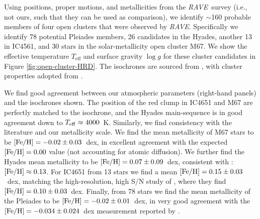 \documentclass[preprint]{aastex61}
\newcommand{\acronym}[1]{{\small{#1}}}
\newcommand{\project}[1]{\textsl{#1}}
\newcommand{\rave}{\project{\acronym{RAVE}}}
\newcommand{\teff}{T_{\mathrm{eff}}}
\newcommand{\logg}{\log g}
\begin{document}
Using positions, proper motions, and metallicities from the \rave\ survey
(i.e., not ours, such that they can be used as comparison), we identify $\sim$160 
probable members of four open clusters that were observed by \rave.
Specifically we identify 78 potential Pleiades members, 26 candidates in the
Hyades, another 13 in IC4561, and 30 stars in the solar-metallicity open
cluster M67.
We show the effective temperature $\teff$ and surface gravity $\logg$ for these
cluster candidates in Figure \ref{fig:open-cluster-HRD}.  The isochrones are 
sourced from \citet{Bressan_2012}, with cluster properties adopted from 
\cite{Kharchenko_2013}.  




We find good agreement between our atmospheric parameters (right-hand panels) and the 
isochrones shown.  The position of the red clump in IC4651 and M67 are perfectly matched
to the isochrone, and the Hyades main-sequence is in good agreement down to 
$T_{\rm eff} \approx 4000$~K.  Similarly, we find consistency with the literature and
our metallicity scale.  We find the mean metallicity of M67 stars to be 
$[{\rm Fe/H}] = -0.02 \pm 0.03$~dex, in excellent agreement with the expected 
$[{\rm Fe/H}] = 0.00$ value (not accounting for atomic diffusion).
We further find the Hyades mean metallicity to be $[{\rm Fe/H}] = 0.07 \pm 0.09$~dex,
consistent with \citet{Paulson_2003}: $[{\rm Fe/H}] \approx 0.13$.
For IC4651 from 13 stars we find a mean $[{\rm Fe/H}] = 0.15 \pm 0.03$~dex, matching the
high-resolution, high S/N study of \citet{Pasquini_2004}, where they find 
$[{\rm Fe/H}] = 0.10 \pm 0.03$~dex. Finally, from 78 stars we find the mean
metallicity of the Pleiades to be $[{\rm Fe/H}] = -0.02 \pm 0.01$~dex, in very 
good agreement with the $[{\rm Fe/H}] = -0.034 \pm 0.024$~dex measurement reported by 
\citet{Friel_Boesgaard_1990}.
\end{document}
